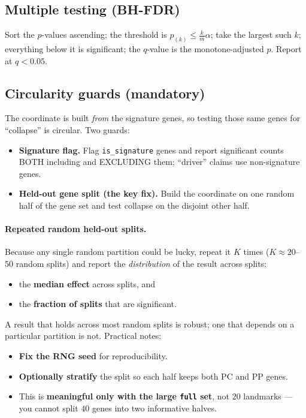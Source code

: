 \documentclass[11pt]{article}
\newcommand{\code}[1]{\texttt{\small #1}}
\begin{document}
\subsection{Multiple testing (BH-FDR)}
Sort the $p$-values ascending; the threshold is $p_{(k)} \le \frac{k}{m}\alpha$; take the largest
such $k$; everything below it is significant; the $q$-value is the monotone-adjusted $p$. Report at
$q < 0.05$.

\subsection{Circularity guards (mandatory)}
The coordinate is built \emph{from} the signature genes, so testing those same genes for
``collapse'' is circular. Two guards:
\begin{itemize}[leftmargin=1.4em]
  \item \textbf{Signature flag.} Flag \code{is\_signature} genes and report significant counts
        BOTH including and EXCLUDING them; ``driver'' claims use non-signature genes.
  \item \textbf{Held-out gene split (the key fix).} Build the coordinate on one random half of the
        gene set and test collapse on the disjoint other half.
\end{itemize}

\paragraph{Repeated random held-out splits.}
Because any single random partition could be lucky, repeat it $K$ times
($K \approx 20$--$50$ random splits) and report the \emph{distribution} of the result across splits:
\begin{itemize}[leftmargin=1.4em]
  \item the \textbf{median effect} across splits, and
  \item the \textbf{fraction of splits} that are significant.
\end{itemize}
A result that holds across most random splits is robust; one that depends on a particular partition
is not. Practical notes:
\begin{itemize}[leftmargin=1.4em]
  \item \textbf{Fix the RNG seed} for reproducibility.
  \item \textbf{Optionally stratify} the split so each half keeps both PC and PP genes.
  \item This is \textbf{meaningful only with the large \code{full} set}, not $20$ landmarks ---
        you cannot split $40$ genes into two informative halves.
\end{itemize}
\end{document}
